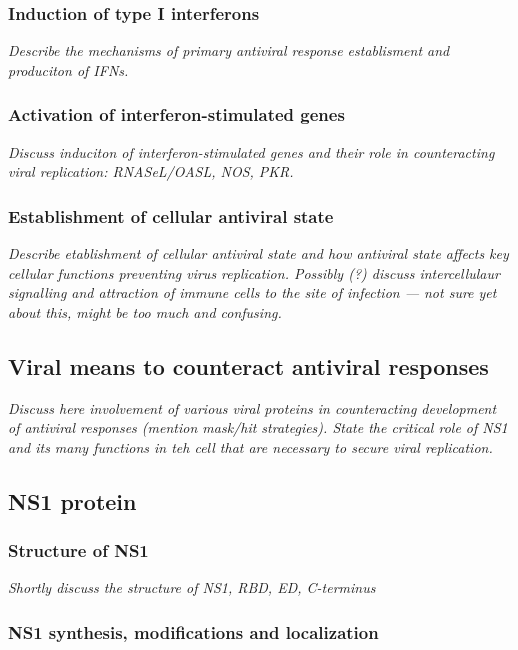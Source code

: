 		\subsubsection{Induction of type I interferons}
		
		\textit{Describe the mechanisms of primary antiviral response establisment and produciton of IFNs.}
		
		\subsubsection{Activation of interferon-stimulated genes}
		
		\textit{Discuss induciton of interferon-stimulated genes and their role in counteracting viral replication: RNASeL/OASL, NOS, PKR.}
		
		\subsubsection{Establishment of cellular antiviral state}
	
		\textit{Describe etablishment of cellular antiviral state and how antiviral state affects key cellular functions preventing virus replication. Possibly (?) discuss intercellulaur signalling and attraction of immune cells to the site of infection --- not sure yet about this, might be too much and confusing.}
		
	\subsection{Viral means to counteract antiviral responses}
	
		\textit{Discuss here involvement of various viral proteins in counteracting development of antiviral responses (mention mask/hit strategies). State the critical role of NS1 and its many functions in teh cell that are necessary to secure viral replication.}
			
	\subsection{NS1 protein}
		
		\subsubsection{Structure of NS1}
		
		\textit{Shortly discuss the structure of NS1, RBD, ED, C-terminus}
		
		\subsubsection{NS1 synthesis, modifications and localization}
			

